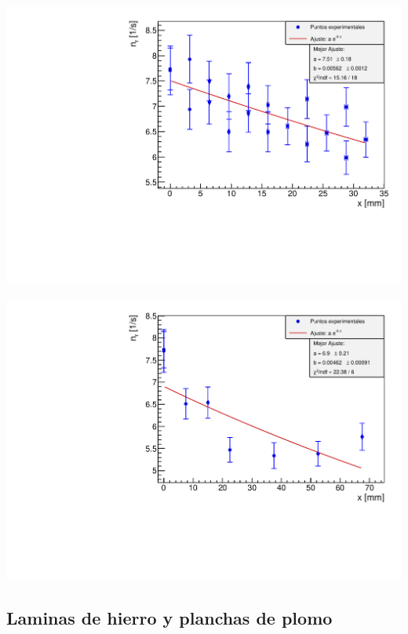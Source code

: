 \documentclass[11pt]{article}
\begin{document}
\begin{minipage}[t]{0.49\linewidth} \centering
	\label{Fig:hierro}
	\includegraphics[width=1\linewidth]{../Graficas/Hierro.pdf}
\end{minipage}
\hfill
\begin{minipage}[t]{0.49\linewidth} \centering
	\label{Fig:plomo}
	\includegraphics[width=1\linewidth]{../Graficas/Plomo2.pdf}
\end{minipage}


\subsection{Laminas de hierro y planchas de plomo}
\end{document}
